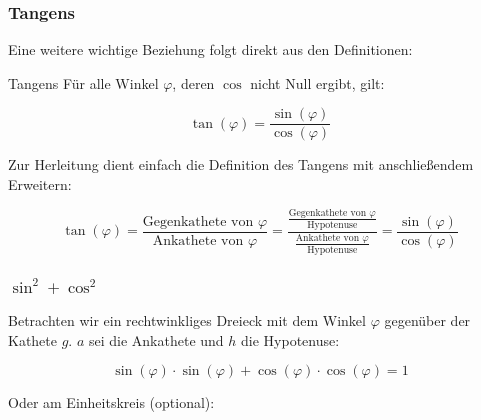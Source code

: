 \subsubsection{Tangens}
Eine weitere wichtige Beziehung folgt direkt aus den Definitionen:

\begin{gesetz}{Tangens}{}
  Für alle Winkel $\varphi$, deren $\cos$ nicht Null ergibt, gilt:

  $$\tan(\varphi) = \frac{\sin(\varphi)}{\cos(\varphi)}$$
  \end{gesetz}
Zur Herleitung dient einfach die Definition des Tangens mit
anschließendem Erweitern:

$$\tan(\varphi) = \frac{\text{Gegenkathete von
  }\varphi}{\text{Ankathete von }\varphi} =
\frac{\frac{\text{Gegenkathete von }
    \varphi}{\text{Hypotenuse}}}{\frac{\text{Ankathete von }\varphi}{\text{Hypotenuse}}}
=\frac{\sin(\varphi)}{\cos(\varphi)}$$

\newpage


\subsubsection{$\sin^2 + \cos^2$}
Betrachten wir ein rechtwinkliges Dreieck mit dem Winkel $\varphi$
gegenüber der Kathete $g$. $a$ sei die Ankathete und $h$ die
Hypotenuse:





\begin{gesetz}{}{}
  $$\sin(\varphi)\cdot \sin(\varphi) + \cos(\varphi) \cdot
  \cos(\varphi) = 1$$
\end{gesetz}
Oder am Einheitskreis (optional):

